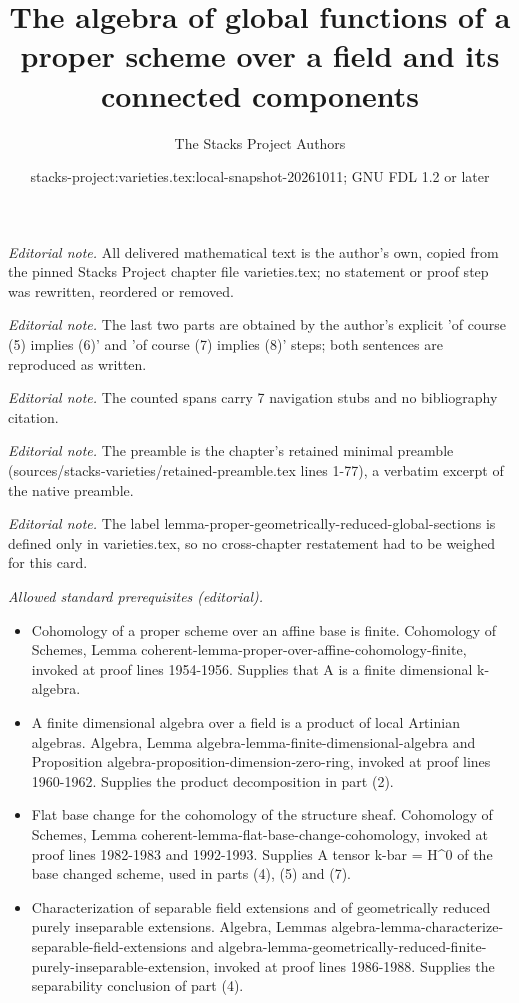 \documentclass[10pt,a4paper]{amsart}
\title{The algebra of global functions of a proper scheme over a field and its connected components}
\author{The Stacks Project Authors}
\date{stacks-project:varieties.tex:local-snapshot-20261011; GNU FDL 1.2 or later}
\theoremstyle{plain}
\theoremstyle{definition}
\theoremstyle{remark}
\numberwithin{equation}{subsection}
\begin{document}
\maketitle
\noindent\textit{Editorial note.} All delivered mathematical text is the author's own, copied from the pinned Stacks Project chapter file varieties.tex; no statement or proof step was rewritten, reordered or removed.\par\medskip
\noindent\textit{Editorial note.} The last two parts are obtained by the author's explicit 'of course (5) implies (6)' and 'of course (7) implies (8)' steps; both sentences are reproduced as written.\par\medskip
\noindent\textit{Editorial note.} The counted spans carry 7 navigation stubs and no bibliography citation.\par\medskip
\noindent\textit{Editorial note.} The preamble is the chapter's retained minimal preamble (sources/stacks-varieties/retained-preamble.tex lines 1-77), a verbatim excerpt of the native preamble.\par\medskip
\noindent\textit{Editorial note.} The label lemma-proper-geometrically-reduced-global-sections is defined only in varieties.tex, so no cross-chapter restatement had to be weighed for this card.\par\medskip
\noindent\textit{Allowed standard prerequisites (editorial).}\begin{itemize}
\item Cohomology of a proper scheme over an affine base is finite. Cohomology of Schemes, Lemma coherent-lemma-proper-over-affine-cohomology-finite, invoked at proof lines 1954-1956. Supplies that A is a finite dimensional k-algebra.
\item A finite dimensional algebra over a field is a product of local Artinian algebras. Algebra, Lemma algebra-lemma-finite-dimensional-algebra and Proposition algebra-proposition-dimension-zero-ring, invoked at proof lines 1960-1962. Supplies the product decomposition in part (2).
\item Flat base change for the cohomology of the structure sheaf. Cohomology of Schemes, Lemma coherent-lemma-flat-base-change-cohomology, invoked at proof lines 1982-1983 and 1992-1993. Supplies A tensor k-bar = H\textasciicircum{}0 of the base changed scheme, used in parts (4), (5) and (7).
\item Characterization of separable field extensions and of geometrically reduced purely inseparable extensions. Algebra, Lemmas algebra-lemma-characterize-separable-field-extensions and algebra-lemma-geometrically-reduced-finite-purely-inseparable-extension, invoked at proof lines 1986-1988. Supplies the separability conclusion of part (4).
\end{itemize}\medskip
\end{document}
